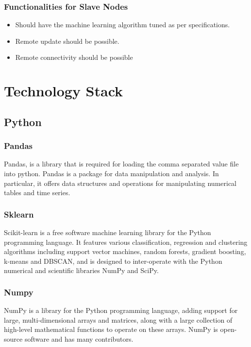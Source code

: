 \documentclass[12pt]{article}
\begin{document}
\subsubsection{Functionalities for Slave Nodes}
\begin{itemize}
\item Should have the machine learning algorithm tuned as per specifications.
\item Remote update should be possible.
\item Remote connectivity should be possible
\end{itemize}


\clearpage
\newpage
\section{Technology Stack}
\subsection{Python}
\subsubsection{Pandas}
Pandas, is a library that is required for loading the comma separated value file into python. Pandas is a package for data manipulation and analysis. In particular, it offers data structures and operations for manipulating numerical tables and time series.\cite{pandas}

\subsubsection{Sklearn}
Scikit-learn is a free software machine learning library for the Python programming language. It features various classification, regression and clustering algorithms including support vector machines, random forests, gradient boosting, k-means and DBSCAN, and is designed to inter-operate with the Python numerical and scientific libraries NumPy and SciPy.\cite{scikit}

\subsubsection{Numpy}
NumPy is a library for the Python programming language, adding support for large, multi-dimensional arrays and matrices, along with a large collection of high-level mathematical functions to operate on these arrays. NumPy is open-source software and has many contributors.\cite{numpy}
\end{document}
